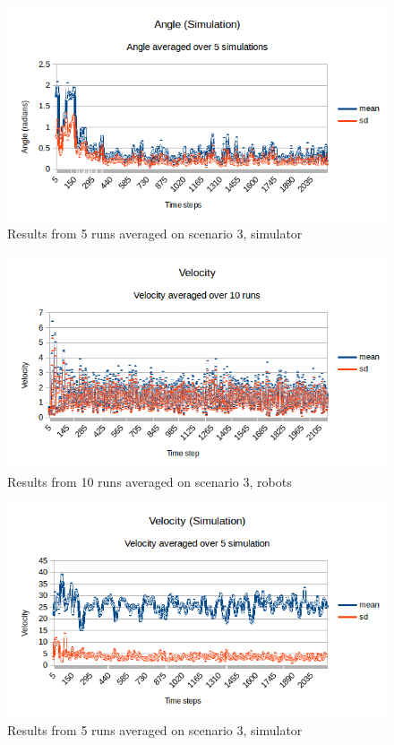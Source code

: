 \begin{figure}[h]
\begin{center}
\includegraphics[width=0.8\linewidth]{figs/runs/3sangle}
\end{center}
\caption[3. Angle, robots]{Results from 5 runs averaged on scenario 3, simulator}
\label{fig:res3sang}
\end{figure}
\begin{figure}[h]
\begin{center}
\includegraphics[width=0.8\linewidth]{figs/runs/3pvel}
\end{center}
\caption[3. Velocity, robots]{Results from 10 runs averaged on scenario 3, robots}
\label{fig:res3pvel}
\end{figure}
\begin{figure}[h]
\begin{center}
\includegraphics[width=0.8\linewidth]{figs/runs/3svel}
\end{center}
\caption[3. Velocity, robots]{Results from 5 runs averaged on scenario 3, simulator}
\label{fig:res3svel}
\end{figure}

